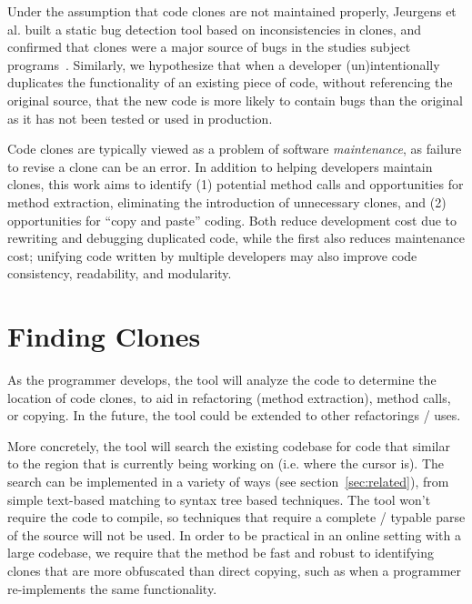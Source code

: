 \documentclass[preprint,10pt]{sigplanconf}
\begin{document}
Under the assumption that code clones are not maintained properly,
Jeurgens et al. built a static bug detection tool based on
inconsistencies in clones, and confirmed that clones were a major
source of bugs in the studies subject programs~\cite{Juergens2009}.
Similarly, we hypothesize that when a developer (un)intentionally
duplicates the functionality of an existing piece of code, without
referencing the original source, that the new code is more likely to
contain bugs than the original as it has not been tested or used in
production.

Code clones are typically viewed as a problem of software
\emph{maintenance}, as failure to revise a clone can be an error. In
addition to helping developers maintain clones, this work aims to
identify (1) potential method calls and opportunities for method
extraction, eliminating the introduction of unnecessary clones, and
(2) opportunities for ``copy and paste'' coding. Both reduce development cost 
due to rewriting and debugging duplicated code,
while the first also reduces maintenance cost; unifying code written
by multiple developers may also improve code consistency, readability, 
and modularity.

\section{Finding Clones}


As the programmer develops, the tool will analyze the code to
determine the location of code clones, to aid in refactoring (method
extraction), method calls, or copying. In the future, the tool could
be extended to other refactorings / uses.

More concretely, the tool will search the existing codebase for code
that similar to the region that is currently being working on
(i.e. where the cursor is). The search can be implemented in a variety
of ways (see section~\ref{sec:related}), from simple text-based
matching to syntax tree based techniques. The tool won't require the
code to compile, so techniques that require a complete / typable parse
of the source will not be used. In order to be practical in an online
setting with a large codebase, we require that the method be fast and
robust to identifying clones that are more obfuscated than direct
copying, such as when a programmer re-implements the same
functionality.
\end{document}
